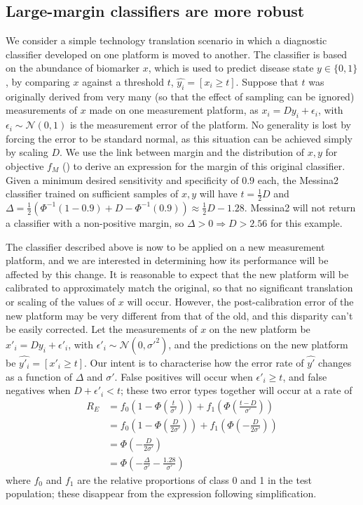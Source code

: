 \documentclass[dissertation.tex]{subfiles}
\begin{document}
\subsection{Large-margin classifiers are more robust}
We consider a simple technology translation scenario in which a diagnostic classifier developed on one platform is moved to another.  The classifier is based on the abundance of biomarker $x$, which is used to predict disease state $y \in \{0, 1\}$, by comparing $x$ against a threshold $t$, $\hat{y_i} = [x_i \geq t]$.  Suppose that $t$ was originally derived from very many (so that the effect of sampling can be ignored) measurements of $x$ made on one measurement platform, as $x_i = D y_i + \epsilon_i$, with $\epsilon_i \sim \mathcal{N}(0, 1)$ is the measurement error of the platform.  No generality is lost by forcing the error to be standard normal, as this situation can be achieved simply by scaling $D$.  We use the link between margin and the distribution of $x, y$ for objective $f_M$ () to derive an expression for the margin of this original classifier.  Given a minimum desired sensitivity and specificity of $0.9$ each, the Messina2 classifier trained on sufficient samples of $x, y$ will have $t = \frac{1}{2}D$ and $\Delta = \frac{1}{2}(\Phi^{-1}(1-0.9)+D-\Phi^{-1}(0.9)) \approx \frac{1}{2}D - 1.28$.  Messina2 will not return a classifier with a non-positive margin, so $\Delta > 0 \Rightarrow D > 2.56$ for this example.

The classifier described above is now to be applied on a new measurement platform, and we are interested in determining how its performance will be affected by this change.  It is reasonable to expect that the new platform will be calibrated to approximately match the original, so that no significant translation or scaling of the values of $x$ will occur.  However, the post-calibration error of the new platform may be very different from that of the old, and this disparity can't be easily corrected.  Let the measurements of $x$ on the new platform be $x'_i = D y_i + \epsilon'_i$, with $\epsilon'_i \sim \mathcal{N}(0, \sigma'^2)$, and the predictions on the new platform be $\hat{y'_i} = [x'_i \geq t]$.  Our intent is to characterise how the error rate of $\hat{y'}$ changes as a function of $\Delta$ and $\sigma'$.  False positives will occur when $\epsilon'_i \geq t$, and false negatives when $D + \epsilon'_i < t$; these two error types together will occur at a rate of
\begin{align*}
R_E &= f_0\left(1-\Phi\left(\frac{t}{\sigma'}\right)\right) + f_1\left(\Phi\left(\frac{t-D}{\sigma'}\right)\right) \\
    &= f_0\left(1-\Phi\left(\frac{D}{2\sigma'}\right)\right) + f_1\left(\Phi\left(-\frac{D}{2\sigma'}\right)\right) \\
    &= \Phi\left(-\frac{D}{2\sigma'}\right) \\
    &= \Phi\left(-\frac{\Delta}{\sigma'} - \frac{1.28}{\sigma'}\right)
\end{align*}
where $f_0$ and $f_1$ are the relative proportions of class 0 and 1 in the test population; these disappear from the expression following simplification.
\end{document}
